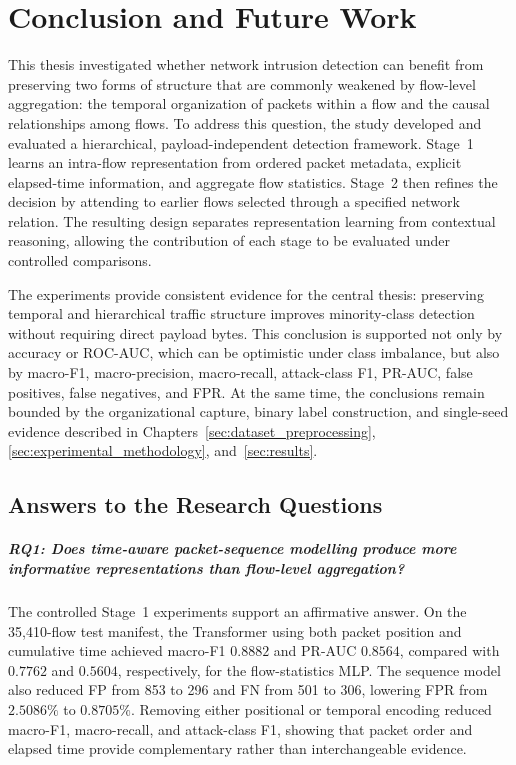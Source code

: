 \documentclass[11pt,fleqn]{report}
\begin{document}
\chapter{Conclusion and Future Work}
\label{sec:conclusion_future_work}

This thesis investigated whether network intrusion detection can benefit from
preserving two forms of structure that are commonly weakened by flow-level
aggregation: the temporal organization of packets within a flow and the causal
relationships among flows. To address this question, the study developed and
evaluated a hierarchical, payload-independent detection framework. Stage~1
learns an intra-flow representation from ordered packet metadata, explicit
elapsed-time information, and aggregate flow statistics. Stage~2 then refines
the decision by attending to earlier flows selected through a specified network
relation. The resulting design separates representation learning from
contextual reasoning, allowing the contribution of each stage to be evaluated
under controlled comparisons.

The experiments provide consistent evidence for the central thesis: preserving
temporal and hierarchical traffic structure improves minority-class detection
without requiring direct payload bytes. This conclusion is supported not only
by accuracy or ROC-AUC, which can be optimistic under class imbalance, but also
by macro-F1, macro-precision, macro-recall, attack-class F1, PR-AUC, false
positives, false negatives, and FPR. At the same time, the conclusions remain
bounded by the organizational capture, binary label construction, and
single-seed evidence described in Chapters~\ref{sec:dataset_preprocessing},
\ref{sec:experimental_methodology}, and~\ref{sec:results}.

\section{Answers to the Research Questions}
\label{subsec:conclusion_rq_answers}

\paragraph{RQ1: Does time-aware packet-sequence modelling produce more
informative representations than flow-level aggregation?}
The controlled Stage~1 experiments support an affirmative answer. On the
35,410-flow test manifest, the Transformer using both packet position and
cumulative time achieved macro-F1 $0.8882$ and PR-AUC $0.8564$, compared with
$0.7762$ and $0.5604$, respectively, for the flow-statistics MLP. The sequence
model also reduced FP from 853 to 296 and FN from 501 to 306, lowering FPR from
$2.5086\%$ to $0.8705\%$. Removing either positional or temporal encoding
reduced macro-F1, macro-recall, and attack-class F1, showing that packet order
and elapsed time provide complementary rather than interchangeable evidence.
\end{document}
